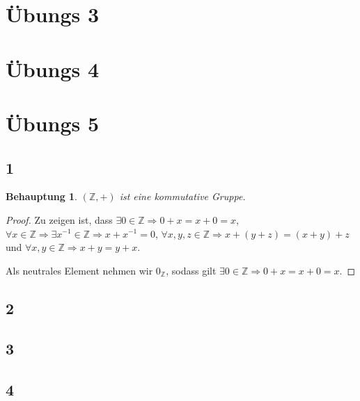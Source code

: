 \documentclass[a4paper,10pt]{article}
\newtheorem*{claim}{Behauptung}
\begin{document}
\section*{Übungs 3}

\section*{Übungs 4}



\section*{Übungs 5}

\subsection*{1}

\begin{claim}
 $(\mathbb{Z}, +)$ ist eine kommutative Gruppe.
\end{claim}

\begin{proof}
 Zu zeigen ist, dass $\exists 0 \in \mathbb{Z} \Rightarrow 0 + x = x + 0 = x$, $\forall x \in \mathbb{Z} \Rightarrow \exists x^{-1} \in \mathbb{Z} \Rightarrow x + x^{-1} = 0$, $\forall x, y, z \in \mathbb{Z} \Rightarrow x + (y + z) = (x + y) + z$ und $\forall x, y \in \mathbb{Z} \Rightarrow x + y = y + x$.
 
 Als neutrales Element nehmen wir $0_{\mathbb{Z}}$, sodass gilt $\exists 0 \in \mathbb{Z} \Rightarrow 0 + x = x + 0 = x$.
\end{proof}

\subsection*{2}

\subsection*{3}

\subsection*{4}
\end{document}
